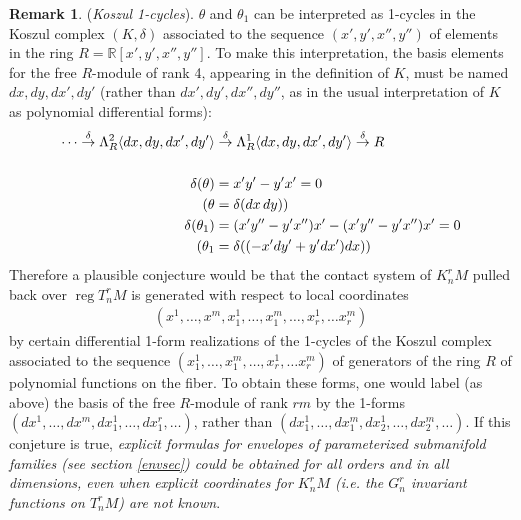 \documentclass[12pt]{article}
\numberwithin{equation}{section}
\theoremstyle{plain}
\theoremstyle{definition}
\newtheorem{remark}[definition]{Remark}
\renewcommand{\P}{\mathbb{P}}
\renewcommand{\L}{\Lambda}
\newcommand{\R}{\mathbb{R}}
\newcommand{\ra}{\rightarrow}
\begin{document}
\begin{remark} (\emph{Koszul 1-cycles}). $\theta$ and $\theta_{1}$ can be interpreted as 1-cycles in the Koszul complex $(K,\delta)$ associated to the sequence $(x',y',x'',y'')$ of elements in the ring $R=\R[x',y',x'',y'']$. To make this interpretation, the basis elements for the free $R$-module of rank 4, appearing in the definition of $K$, must be named $dx,dy,dx',dy'$ (rather than $dx',dy',dx'',dy''$, as in the usual interpretation of $K$ as polynomial differential forms):
\begin{align*}
\cdots\overset{\delta}{\ra} \L^{2}_{R}\langle dx,dy,dx',dy'\rangle&\overset{\delta}{\ra} \L^{1}_{R}\langle dx,dy,dx',dy'\rangle\overset{\delta}{\ra} R\\
&\quad\\
\delta(\theta)&=x'y'-y'x'=0\\
(\theta&=\delta(dx\thinspace dy))\\
\delta(\theta_{1})&=(x'y''-y'x'')x'-(x'y''-y'x'')x'=0\\
(\theta_{1}&=\delta((-x'dy'+y'dx')dx))
\end{align*}
Therefore a plausible conjecture would be that the contact system of $K^{r}_{n}M$ pulled back over $\operatorname{reg}T^{r}_{n}M$ is generated with respect to local coordinates
\begin{align*}
(x^{1},\dots,x^{m},x^{1}_{1},\dots,x^{m}_{1},\dots,x^{1}_{r},\dots x^{m}_{r})
\end{align*}
by certain differential 1-form realizations of the 1-cycles of the Koszul complex associated to the sequence $(x^{1}_{1},\dots,x^{m}_{1},\dots,x^{1}_{r},\dots x^{m}_{r})$ of generators of the ring $R$ of polynomial functions on the fiber. To obtain these forms, one would label (as above) the basis of the free $R$-module of rank $rm$ by the 1-forms $(dx^{1},\dots,dx^{m},dx^{1}_{1},\dots,dx^{r}_{1},\dots)$, rather than $(dx^{1}_{1},\dots,dx^{m}_{1},dx^{1}_{2},\dots,dx^{m}_{2},\dots)$. If this conjeture is true, \emph{explicit formulas for envelopes of parameterized submanifold families (see section \ref{envsec}) could be obtained for all orders and in all dimensions, even when explicit coordinates for $K^{r}_{n}M$ (i.e. the $G^{r}_{n}$ invariant functions on $T^{r}_{n}M$) are not known}.
\end{remark}

\end{document}

